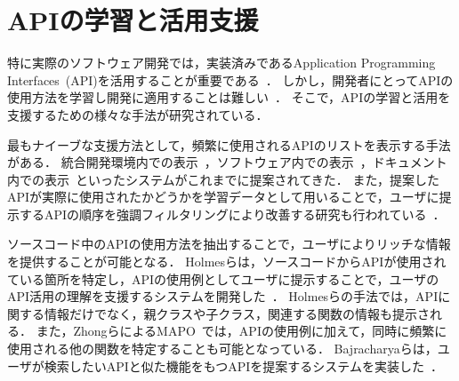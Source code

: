 \section{APIの学習と活用支援}

特に実際のソフトウェア開発では，実装済みであるApplication Programming Interfaces~(API)を活用することが重要である~\cite{Patterns_for_API_migration}．
しかし，開発者にとってAPIの使用方法を学習し開発に適用することは難しい~\cite{robillard2011field}．
そこで，APIの学習と活用を支援するための様々な手法が研究されている．

最もナイーブな支援方法として，頻繁に使用されるAPIのリストを表示する手法がある．
統合開発環境内での表示~\cite{Holmes_2008_MSR_Eclipse_APIs}，ソフトウェア内での表示~\cite{UIST_2009_CommunityCommands}，ドキュメント内での表示~\cite{VLHCC_2009_API_doc_API_usage}といったシステムがこれまでに提案されてきた．
また，提案したAPIが実際に使用されたかどうかを学習データとして用いることで，ユーザに提示するAPIの順序を強調フィルタリングにより改善する研究も行われている~\cite{colab_filtering_api_recommend}．

ソースコード中のAPIの使用方法を抽出することで，ユーザによりリッチな情報を提供することが可能となる．
Holmesらは，ソースコードからAPIが使用されている箇所を特定し，APIの使用例としてユーザに提示することで，ユーザのAPI活用の理解を支援するシステムを開発した~\cite{Holmes_2006_recommend_api_example}．
Holmesらの手法では，APIに関する情報だけでなく，親クラスや子クラス，関連する関数の情報も提示される．
また，ZhongらによるMAPO~\cite{extended_MAPO}では，APIの使用例に加えて，同時に頻繁に使用される他の関数を特定することも可能となっている．
Bajracharyaらは，ユーザが検索したいAPIと似た機能をもつAPIを提案するシステムを実装した~\cite{Bajracharya:2010:LUS}．

